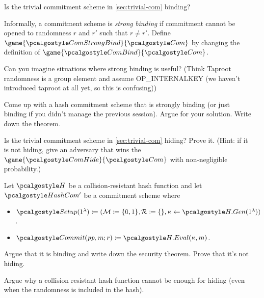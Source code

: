 \begin{exercise}
  Is the trivial commitment scheme in \cref{sec:trivial-com} binding?
\end{exercise}

\begin{exercise}
  Informally, a commitment scheme is \emph{strong binding} if commitment cannot be opened to randomness $r$ and $r'$ such that $r \neq r'$. 
  Define $\game{\algo{ComStrongBind}}{\algo{Com}}$ by changing the definition of $\game{\algo{ComBind}}{\algo{Com}}$.
\end{exercise}

\begin{exercise}
  Can you imagine situations where strong binding is useful? (Think Taproot randomness is a group element and assume OP\_INTERNALKEY (we haven't introduced taproot at all yet, so this is confusing))
\end{exercise}

\begin{exercise}
  Come up with a hash commitment scheme that is strongly binding (or just binding if you didn't manage the previous session). Argue for your solution. Write down the theorem.
\end{exercise}

\begin{exercise}
  Is the trivial commitment scheme in \cref{sec:trivial-com} hiding?
  Prove it.
  (Hint: if it is not hiding, give an adversary that wins the $\game{\algo{ComHide}}{\algo{Com}}$ with non-negligible probability.)
\end{exercise}

\begin{exercise}
  Let $\algo{H}$ be a collision-resistant hash function and let $\algo{HashCom'}$ be a commitment scheme where
  \begin{itemize}
    \item $\algo{Setup}(1^\lambda) \defeq (\mathcal{M} \defeq \{0, 1\}, \mathcal{R} \defeq \{\}, \kappa \gets \algo{H.Gen}(1^\lambda))$.
    \item $\algo{Commit}(\params,m;r) \defeq  \algo{H.Eval}(\kappa, m)$.
  \end{itemize}
  Argue that it is binding and write down the security theorem.
  Prove that it's not hiding.
\end{exercise}

\begin{exercise}
  Argue why a collision resistant hash function cannot be enough for hiding (even when the randomness is included in the hash).
\end{exercise}
